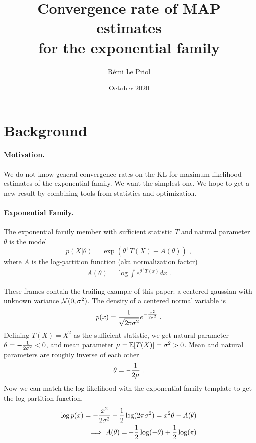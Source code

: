\documentclass{article}
\title{Convergence rate of MAP estimates \\
for the exponential family}
\author{R\'emi Le Priol}
\date{October 2020}
\newcommand{\logpart}{A}
\newcommand{\natp}{\theta}
\begin{document}
\maketitle

\section{Background}

\paragraph{Motivation.} 
We do not know general convergence rates on the KL for maximum likelihood estimates of the exponential family.
We want the simplest one.
We hope  to get a new result by combining tools from statistics and optimization. 
\paragraph{Exponential Family.}
The exponential family member with sufficient statistic $T$ and natural parameter $\natp$ is the model 
\begin{equation}
	 p(X|\natp) = \exp( \natp^\top T(X) - \logpart(\natp)) \; ,
\end{equation}
where $\logpart$ is the log-partition function (aka normalization factor) 
\begin{align}
    \logpart(\natp) = \log \int e^{\natp^\top T(x)} dx \; .
\end{align}

\begin{example}
	These frames contain the trailing example of this paper: a centered gaussian with unknown variance ${\mathcal N}(0,\sigma^2)$.
	The density of a centered normal variable is
\begin{align}
	p(x) = \frac{1}{\sqrt{2\pi \sigma^2}} e^{-\frac{x^2}{2 \sigma^2}} \; .
\end{align}
Defining $T(X)=X^2$ as the sufficient statistic, we get natural parameter $\natp = -\inv{2 \sigma^2} <0$, and mean parameter $\mu=\operatorname{\mathbb{E}}[T(X)] = \sigma^2 >0$. 
Mean and natural parameters are roughly inverse of each other
\begin{align}
	\natp = -\inv{2 \mu}\; .
\end{align}
Now we can match the log-likelihood with the exponential family template to get the log-partition function.
\begin{align}
	\log p(x) = - \frac{x^2}{2 \sigma^2} - \half \log(2 \pi \sigma^2 ) 
	= x^2 \natp - \logpart(\natp) \\
	\implies \logpart (\natp) = - \half \log(-\natp)  + \half \log(\pi) 
\end{align}
\end{example}
\end{document}
